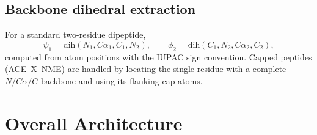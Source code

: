\documentclass[11pt,a4paper]{article}
\begin{document}
\subsection{Backbone dihedral extraction}
For a standard two-residue dipeptide,
\[
\psi_1 = \mathrm{dih}(N_1, C\alpha_1, C_1, N_2), \qquad
\phi_2 = \mathrm{dih}(C_1, N_2, C\alpha_2, C_2),
\]
computed from atom positions with the IUPAC sign convention. Capped peptides
(ACE--X--NME) are handled by locating the single residue with a complete
$N/C\alpha/C$ backbone and using its flanking cap atoms.

\section{Overall Architecture}
\end{document}
